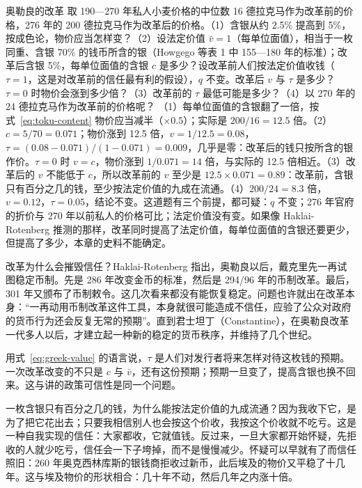 \begin{example}{奥勒良的改革}\label{ex:greek-trust}
取 190—270 年私人小麦价格的中位数 16 德拉克马作为改革前的价格，276 年的 200 德拉克马作为改革后的价格。（1）含银从约 2.5\% 提高到 5\%，按成色论，物价应当怎样变？（2）设法定价值 $\bar v=1$（每单位面值），相当于一枚同重、含银 70\% 的钱币所含的银（Howgego 等表 1 中 155—180 年的标准）；改革后含银 5\%，每单位面值的含银 $c$ 是多少？设改革前人们按法定价值收钱（$\tau=1$，这是对改革前的信任最有利的假设），$q$ 不变。改革后 $v$ 与 $\tau$ 是多少？$\tau=0$ 时物价会涨到多少倍？（3）改革前的 $\tau$ 最低可能是多少？（4）以 270 年的 24 德拉克马作为改革前的价格呢？
\solution （1）每单位面值的含银翻了一倍，按式~\eqref{eq:toku-content} 物价应当减半（$\times0.5$）；实际是 $200/16=12.5$ 倍。（2）$c=5/70=0.071$；物价涨到 12.5 倍，$v=1/12.5=0.08$，$\tau=(0.08-0.071)/(1-0.071)=0.009$，几乎是零：改革后的钱只按所含的银作价。$\tau=0$ 时 $v=c$，物价涨到 $1/0.071=14$ 倍，与实际的 12.5 倍相近。（3）改革后的 $v$ 不能低于 $c$，所以改革前的 $v$ 至少是 $12.5\times0.071=0.89$：改革前，含银只有百分之几的钱，至少按法定价值的九成在流通。（4）$200/24=8.3$ 倍，$v=0.12$，$\tau=0.05$，结论不变。这道题有三个前提，都可疑：$q$ 不变；276 年官府的折价与 270 年以前私人的价格可比；法定价值没有变。如果像 Haklai-Rotenberg 推测的那样，改革同时提高了法定价值，每单位面值的含银还要更少，但提高了多少，本章的史料不能确定。
\end{example}

改革为什么会摧毁信任？Haklai-Rotenberg 指出，奥勒良以后，戴克里先一再试图稳定币制。先是 286 年改变金币的标准，然后是 294/96 年的币制改革。最后，301 年又颁布了币制敕令。这几次看来都没有能恢复稳定。问题也许就出在改革本身：“一再动用币制改革这件工具，本身就很可能造成不信任，应验了公众对政府的货币行为还会反复无常的预期”。直到君士坦丁（Constantine），在奥勒良改革一代多人以后，才建立起一种新的稳定的货币秩序，并维持了几个世纪\cite{haklai2011}。

用式~\eqref{eq:greek-value} 的语言说，$\tau$ 是人们对发行者将来怎样对待这枚钱的预期。一次改革改变的不只是 $c$ 与 $\bar v$，还有这份预期；预期一旦变了，提高含银也换不回来。这与讲的政策可信性是同一个问题。

\begin{intuition}
一枚含银只有百分之几的钱，为什么能按法定价值的九成流通？因为我收下它，是为了把它花出去；只要我相信别人也会按这个价收，我按这个价收就不吃亏。这是一种自我实现的信任：大家都收，它就值钱。反过来，一旦大家都开始怀疑，先拒收的人就少吃亏，信任会一下子垮掉，而不是慢慢减少。怀疑可以早就有了而信任照旧：260 年奥克西林库斯的银钱商拒收过新币，此后埃及的物价又平稳了十几年。这与埃及物价的形状相合：几十年不动，然后几年之内涨十倍。
\end{intuition}


